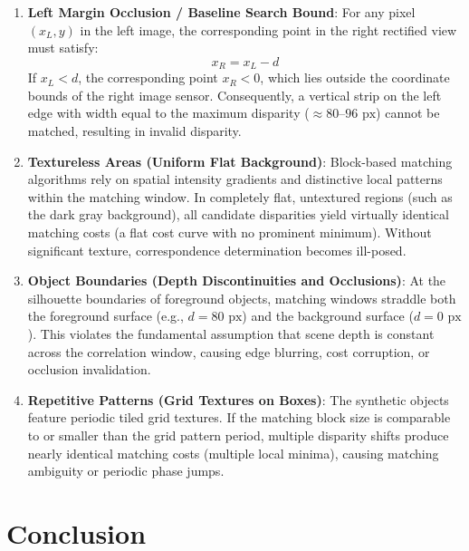 \documentclass[12pt]{article}
\begin{document}
\begin{enumerate}
    \item \textbf{Left Margin Occlusion / Baseline Search Bound}:
    For any pixel $(x_L, y)$ in the left image, the corresponding point in the right rectified view must satisfy:
    \begin{equation}
    x_R = x_L - d
    \end{equation}
    If $x_L < d$, the corresponding point $x_R < 0$, which lies outside the coordinate bounds of the right image sensor. Consequently, a vertical strip on the left edge with width equal to the maximum disparity ($\approx 80\text{--}96\text{ px}$) cannot be matched, resulting in invalid disparity.
    
    \item \textbf{Textureless Areas (Uniform Flat Background)}:
    Block-based matching algorithms rely on spatial intensity gradients and distinctive local patterns within the matching window. In completely flat, untextured regions (such as the dark gray background), all candidate disparities yield virtually identical matching costs (a flat cost curve with no prominent minimum). Without significant texture, correspondence determination becomes ill-posed.
    
    \item \textbf{Object Boundaries (Depth Discontinuities and Occlusions)}:
    At the silhouette boundaries of foreground objects, matching windows straddle both the foreground surface (e.g., $d = 80\text{ px}$) and the background surface ($d = 0\text{ px}$). This violates the fundamental assumption that scene depth is constant across the correlation window, causing edge blurring, cost corruption, or occlusion invalidation.
    
    \item \textbf{Repetitive Patterns (Grid Textures on Boxes)}:
    The synthetic objects feature periodic tiled grid textures. If the matching block size is comparable to or smaller than the grid pattern period, multiple disparity shifts produce nearly identical matching costs (multiple local minima), causing matching ambiguity or periodic phase jumps.
\end{enumerate}

\section{Conclusion}
\end{document}
